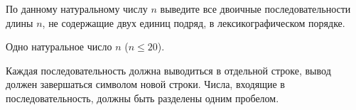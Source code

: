По данному натуральному числу $n$ выведите все двоичные последовательности длины $n$, не содержащие двух единиц подряд, в лексикографическом порядке.

\InputFile

Одно натуральное число $n$ ($n \le 20$).

\OutputFile

Каждая последовательность должна выводиться в отдельной строке, вывод должен завершаться символом новой строки.
Числа, входящие в последовательность, должны быть разделены одним пробелом.
